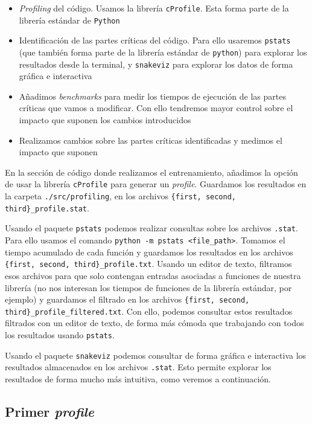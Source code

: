 \begin{itemize}
    \item \textit{Profiling} del código. Usamos la librería \lstinline{cProfile}. Esta forma parte de la librería estándar de \lstinline{Python}
    \item Identificación de las partes críticas del código. Para ello usaremos \lstinline{pstats} (que también forma parte de la librería estándar de \lstinline{python}) para explorar los resultados desde la terminal, y \lstinline{snakeviz} para explorar los datos de forma gráfica e interactiva
    \item Añadimos \textit{benchmarks} para medir los tiempos de ejecución de las partes críticas que vamos a modificar. Con ello tendremos mayor control sobre el impacto que suponen los cambios introducidos
    \item Realizamos cambios sobre las partes críticas identificadas y medimos el impacto que suponen
\end{itemize}

En la sección de código donde realizamos el entrenamiento, añadimos la opción de usar la librería \lstinline{cProfile} para generar un \textit{profile}. Guardamos los resultados en la carpeta \lstinline{./src/profiling}, en los archivos \lstinline|{first, second, third}_profile.stat|.

Usando el paquete \lstinline{pstats} podemos realizar consultas sobre los archivos \lstinline{.stat}. Para ello usamos el comando \lstinline{python -m pstats <file_path>}. Tomamos el tiempo acumulado de cada función y guardamos los resultados en los archivos \lstinline|{first, second, third}_profile.txt|. Usando un editor de texto, filtramos esos archivos para que solo contengan entradas asociadas a funciones de nuestra librería (no nos interesan los tiempos de funciones de la librería estándar, por ejemplo) y guardamos el filtrado en los archivos \lstinline|{first, second, third}_profile_filtered.txt|. Con ello, podemos consultar estos resultados filtrados con un editor de texto, de forma más cómoda que trabajando con todos los resultados usando \lstinline{pstats}.

Usando el paquete \lstinline{snakeviz} podemos consultar de forma gráfica e interactiva los resultados almacenados en los archivos \lstinline{.stat}. Esto permite explorar los resultados de forma mucho más intuitiva, como veremos a continuación.

\subsection{Primer \textit{profile}}


